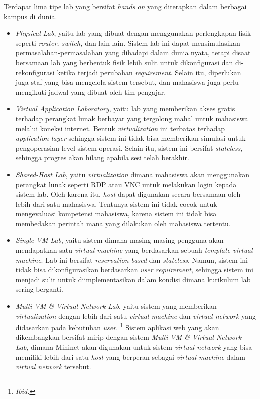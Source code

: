 Terdapat lima tipe lab yang bersifat \textit{hands on} yang diterapkan dalam berbagai kampus di dunia.
\begin{itemize}
	\item \textit{Physical Lab}, yaitu lab yang dibuat dengan menggunakan perlengkapan fisik seperti \textit{router, switch,} dan lain-lain. Sistem lab ini dapat mensimulasikan permasalahan-permasalahan yang dihadapi dalam dunia nyata,
	tetapi disaat bersamaan lab yang berbentuk fisik lebih sulit untuk dikonfigurasi dan di-rekonfigurasi ketika terjadi perubahan \textit{requirement}. Selain itu, diperlukan juga staf yang bisa mengelola sistem tersebut, dan mahasiswa
	juga perlu mengikuti jadwal yang dibuat oleh tim pengajar.
	\item \textit{Virtual Application Laboratory}, yaitu lab yang memberikan akses gratis terhadap perangkat lunak berbayar yang tergolong mahal untuk mahasiswa melalui koneksi internet. Bentuk \textit{virtualization} ini terbatas terhadap
	\textit{application layer} sehingga sistem ini tidak bisa memberikan simulasi untuk pengoperasian level sistem operasi. Selain itu, sistem ini bersifat \textit{stateless}, sehingga progres akan hilang apabila sesi telah berakhir.
	\item \textit{Shared-Host Lab}, yaitu \textit{virtualization} dimana mahasiswa akan menggunakan perangkat lunak seperti RDP atau VNC untuk melakukan login kepada sistem lab. Oleh karena itu, \textit{host} dapat digunakan secara bersamaan 
	oleh lebih dari satu mahasiswa. Tentunya sistem ini tidak cocok untuk mengevaluasi kompetensi mahasiswa, karena sistem ini tidak bisa membedakan perintah mana yang dilakukan oleh mahasiswa tertentu.
	\item \textit{Single-VM Lab}, yaitu sistem dimana masing-masing pengguna akan mendapatkan satu \textit{virtual machine} yang berdasarkan sebuah \textit{template virtual machine}. Lab ini bersifat \textit{reservation based} dan \textit{stateless}.
	Namun, sistem ini tidak bisa dikonfigurasikan berdasarkan \textit{user requirement}, sehingga sistem ini menjadi sulit untuk diimplementasikan dalam kondisi dimana kurikulum lab sering berganti.
	\item \textit{Multi-VM \& Virtual Network Lab}, yaitu sistem yang memberikan \textit{virtualization} dengan lebih dari satu \textit{virtual machine} dan \textit{virtual network} yang didasarkan pada kebutuhan \textit{user}.
	\footnote{\textit{Ibid.}}
	Sistem aplikasi web yang akan dikembangkan bersifat mirip dengan sistem \textit{Multi-VM \& Virtual Network Lab}, dimana Mininet akan digunakan untuk sistem \textit{virtual network} yang bisa memiliki lebih dari satu \textit{host} yang berperan sebagai
	\textit{virtual machine} dalam \textit{virtual network} tersebut.  
\end{itemize}
